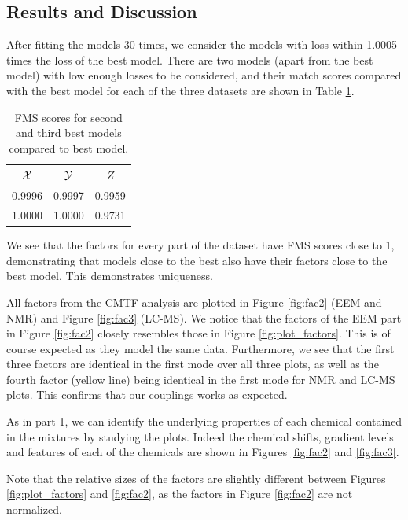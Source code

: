 \subsection*{Results and Discussion}

After fitting the models 30 times, we consider the models with loss within 1.0005 times the loss of the best model.
There are two models (apart from the best model) with low enough losses to be considered, and their match scores compared with the best model for each of the three datasets are shown in Table \ref{tab:score}.

\begin{table}[H]
    \centering
    \begin{tabular}{|c|c|c|}
         \hline
         $\mathcal{X}$ & $\mathcal{Y}$ & $Z$ \\
         \hline
         0.9996 & 0.9997 & 0.9959 \\
         \hline
         1.0000 & 1.0000 & 0.9731 \\
         \hline
    \end{tabular}
    \caption{FMS scores for second and third best models compared to best model.}
    \label{tab:score}
\end{table}

We see that the factors for every part of the dataset have FMS scores close to 1, demonstrating that models close to the best also have their factors close to the best model.
This demonstrates uniqueness.

All factors from the CMTF-analysis are plotted in Figure \ref{fig:fac2} (EEM and NMR) and Figure \ref{fig:fac3} (LC-MS).
We notice that the factors of the EEM part in Figure \ref{fig:fac2} closely resembles those in Figure \ref{fig:plot_factors}.
This is of course expected as they model the same data.
Furthermore, we see that the first three factors are identical in the first mode over all three plots, as well as the fourth factor (yellow line) being identical in the first mode for NMR and LC-MS plots.
This confirms that our couplings works as expected.

As in part 1, we can identify the underlying properties of each chemical contained in the mixtures by studying the plots.
Indeed the chemical shifts, gradient levels and features of each of the chemicals are shown in Figures \ref{fig:fac2} and \ref{fig:fac3}.

Note that the relative sizes of the factors are slightly different between Figures \ref{fig:plot_factors} and \ref{fig:fac2}, as the factors in Figure \ref{fig:fac2} are not normalized.

